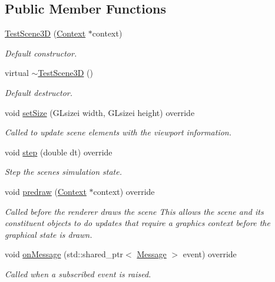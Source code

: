 \subsection*{Public Member Functions}
\begin{DoxyCompactItemize}
\item 
\hyperlink{class_test_scene3_d_a0e6437d4668fbb54f7d62d408e0a99ea}{Test\+Scene3D} (\hyperlink{class_context}{Context} $\ast$context)
\begin{DoxyCompactList}\small\item\em Default constructor. \end{DoxyCompactList}\item 
virtual \hyperlink{class_test_scene3_d_a912bd9b4b8561d3ed9caab3ad42d2693}{$\sim$\+Test\+Scene3D} ()
\begin{DoxyCompactList}\small\item\em Default destructor. \end{DoxyCompactList}\item 
void \hyperlink{class_test_scene3_d_ab762c0baa39e323b598f08945d50bb1f}{set\+Size} (G\+Lsizei width, G\+Lsizei height) override
\begin{DoxyCompactList}\small\item\em Called to update scene elements with the viewport information. \end{DoxyCompactList}\item 
void \hyperlink{class_test_scene3_d_aebf275cd7c567dca7d8662ff859d2acf}{step} (double dt) override
\begin{DoxyCompactList}\small\item\em Step the scene\textquotesingle{}s simulation state. \end{DoxyCompactList}\item 
void \hyperlink{class_test_scene3_d_ab87089331bf0fb71d09361624dc1c53e}{predraw} (\hyperlink{class_context}{Context} $\ast$context) override
\begin{DoxyCompactList}\small\item\em Called before the renderer draws the scene This allows the scene and its constituent objects to do updates that require a graphics context before the graphical state is drawn. \end{DoxyCompactList}\item 
void \hyperlink{class_test_scene3_d_aa5c6527ffc929e51eb3303431bfc6f7d}{on\+Message} (std\+::shared\+\_\+ptr$<$ \hyperlink{class_message}{Message} $>$ event) override
\begin{DoxyCompactList}\small\item\em Called when a subscribed event is raised. \end{DoxyCompactList}\end{DoxyCompactItemize}
